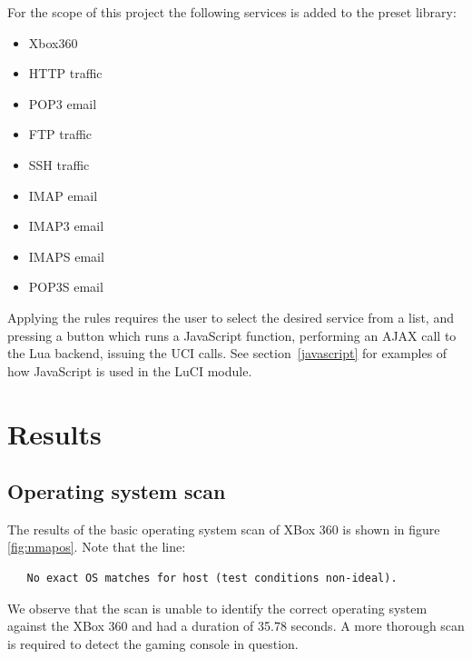 \documentclass[a4paper,11pt,makeidx]{kth-bcs}
\begin{document}
For the scope of this project the following services is added to the preset library:
\begin{itemize}
   \item Xbox360
   \item HTTP traffic
   \item POP3 email
   \item FTP traffic
   \item SSH traffic
   \item IMAP email
   \item IMAP3 email
   \item IMAPS email
   \item POP3S email
\end{itemize}

Applying the rules requires the user to select the desired service from a list, and pressing a button which runs a JavaScript function, performing an AJAX call to the Lua backend, issuing the UCI calls.
See section~\ref{javascript} for examples of how JavaScript is used in the LuCI module.


\chapter{Results}
\section{Operating system scan}
The results of the basic operating system scan of XBox 360 is shown in figure \ref{fig:nmapos}.
Note that the line:
\begin{verbatim}
   No exact OS matches for host (test conditions non-ideal).
\end{verbatim}

We observe that the scan is unable to identify the correct operating system against the XBox 360 and had a duration of 35.78 seconds.
A more thorough scan is required to detect the gaming console in question.
\end{document}
